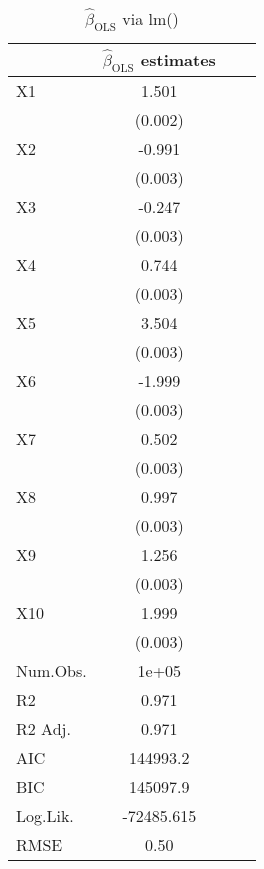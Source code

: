 \documentclass{article}
\begin{document}
\begin{table}
\centering
\caption{$\hat{\beta}_{\text{OLS}}$ via lm()}
\label{tab:lm_beta_estimates}
\begin{tabular}{@{}lccc@{}}
\toprule
  & $\hat{\beta}_{\text{OLS}}$ estimates\\
\midrule
X1 & 1.501\\
 & (0.002)\\
X2 & -0.991\\
 & \vphantom{8} (0.003)\\
X3 & -0.247\\
 & \vphantom{7} (0.003)\\
X4 & 0.744\\
 & \vphantom{6} (0.003)\\
X5 & 3.504\\
 & \vphantom{5} (0.003)\\
X6 & -1.999\\
 & \vphantom{4} (0.003)\\
X7 & 0.502\\
 & \vphantom{3} (0.003)\\
X8 & 0.997\\
 & \vphantom{2} (0.003)\\
X9 & 1.256\\
 & \vphantom{1} (0.003)\\
X10 & 1.999\\
 & (0.003)\\
\midrule
Num.Obs. & 1e+05\\
R2 & 0.971\\
R2 Adj. & 0.971\\
AIC & 144993.2\\
BIC & 145097.9\\
Log.Lik. & -72485.615\\
RMSE & 0.50\\
\bottomrule
\end{tabular}
\label{Table:1}
\end{table}
\end{document}
